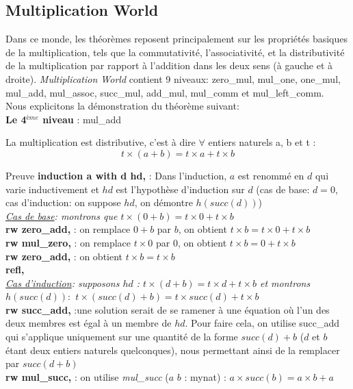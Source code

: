 \subsection{Multiplication World}
Dans ce monde, les théorèmes reposent principalement sur les propriétés basiques de la multiplication, tels que la commutativité, l'associativité, et la distributivité de la multiplication par rapport à l'addition dans les deux sens (à gauche et à droite). \textit{Multiplication World} contient 9 niveaux: zero\_mul, mul\_one, one\_mul, mul\_add, mul\_assoc, succ\_mul, add\_mul, mul\_comm et mul\_left\_comm.\\ Nous explicitons la démonstration du théorème suivant: \\
\textbf{Le 4$^{ème}$ niveau} : mul\_add  \begin{center} La multiplication est distributive, c'est à dire $\forall$ entiers naturels a, b et t : $$t\times(a+b)=t\times a+t\times b$$ \end{center}
Preuve
\textbf{induction a with d hd,} : Dans l'induction, \textbf{$a$} est renommé en \textbf{$d$} qui varie inductivement et \textbf{$hd$} est l'hypothèse d'induction sur $d$ (cas de base: $d=0$, cas d'induction: on suppose $hd$, on démontre $h(succ(d))$)  \\
\textit{\underline{Cas de base}: montrons que $t \times (0 + b) = t \times 0 + t \times b$}\\
\textbf{rw zero\_add,} : on remplace $0+b$ par $b$, on obtient $t\times b=t\times0+t\times b$ \\
\textbf{rw mul\_zero,} : on remplace $t\times0$ par $0$, on obtient $t\times b=0+t\times b$ \\
\textbf{rw zero\_add,} : on obtient $t\times b=t\times b$ \\
\textbf{refl,} \\
\textit{\underline{Cas d'induction}: supposons $hd$ : $t\times(d+b) = t \times d + t \times b$ et montrons $h(succ(d)):$ $t \times (succ (d) + b) = t \times succ (d) + t \times b$ }\\
\textbf{rw succ\_add,} :une solution serait de se ramener à une équation où l'un des deux membres est égal à un membre de $hd$. Pour faire cela, on utilise succ\_add qui s'applique uniquement sur une quantité de la forme $succ(d)+b$ ($d$ et $b$ étant deux entiers naturels quelconques), nous permettant ainsi de la remplacer par $succ(d+b)$\\
\textbf{rw mul\_succ,} : on utilise \textit{mul\_succ} ($a$ $b$ : mynat) : $a \times succ(b) = a \times b + a $\\

